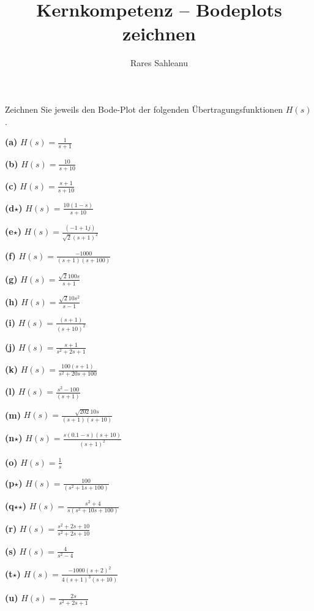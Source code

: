 \documentclass[a4paper,12pt]{article}
\title{Kernkompetenz – Bodeplots zeichnen}
\date{}
\author{Rares Sahleanu}
\begin{document}
\maketitle

\noindent
Zeichnen Sie jeweils den Bode-Plot der folgenden Übertragungsfunktionen \( H(s) \).\\[1em]

\newcommand{\aufgabe}[2]{
  \parbox[t]{0.48\textwidth}{
    \textbf{(#1)} \quad \Large\( #2 \)
  }
}


\aufgabe{a}{H(s) = \frac{1}{s + 1}}
\hfill
\aufgabe{b}{H(s) = \frac{10}{s + 10}}

\vspace{1.5em}

\aufgabe{c}{H(s) = \frac{s + 1}{s + 10}}
\hfill
\aufgabe{d\textbf{$\star$}}{H(s) = \frac{10(1-s)}{s + 10}}

\vspace{1.5em}

\aufgabe{e\textbf{$\star$}}{H(s) = \frac{(-1+1j)}{\sqrt{2}(s + 1)^2}}
\hfill
\aufgabe{f}{H(s) = \frac{-1000}{(s + 1)(s + 100)}}

\vspace{1.5em}

\aufgabe{g}{H(s) = \frac{\sqrt{2}100s}{s + 1}}
\hfill
\aufgabe{h}{H(s) = \frac{\sqrt{2} 10s^2}{s - 1}}

\vspace{1.5em}

\aufgabe{i}{H(s) = \frac{(s + 1)}{(s + 10)^2}}
\hfill
\aufgabe{j}{H(s) = \frac{s + 1}{s^2 + 2s + 1}}

\vspace{1.5em}

\aufgabe{k}{H(s) = \frac{100(s + 1)}{s^2 + 20s + 100}}
\hfill
\aufgabe{l}{H(s) = \frac{s^2 - 100}{(s + 1)}}

\vspace{1.5em}

\aufgabe{m}{H(s) = \frac{\sqrt{202}10s}{(s + 1)(s + 10)}}
\hfill
\aufgabe{n\textbf{$\star$}}{H(s) = \frac{s(0.1-s)(s + 10)}{(s + 1)^2}}

\vspace{1.5em}

\aufgabe{o}{H(s) = \frac{1}{s}}
\hfill
\aufgabe{p\textbf{$\star$}}{H(s) = \frac{100}{(s^2 + 1s + 100)}}


\vspace{1.5em}


\aufgabe{q\textbf{$\star$}\textbf{$\star$}}{H(s) = \frac{s^2 + 4}{s(s^2 + 10s + 100)}}
\hfill
\aufgabe{r}{H(s) = \frac{s^2 + 2s + 10}{s^2 + 2s + 10}}

\vspace{1.5em}

\aufgabe{s}{H(s) = \frac{4}{s^2 - 4}}
\hfill
\aufgabe{t\textbf{$\star$}}{H(s) = \frac{-1000(s + 2)^2}{4(s + 1)^3(s + 10)}}

\hfill

\aufgabe{u}{H(s) = \frac{2s}{s^2 + 2s + 1}}
\end{document}
